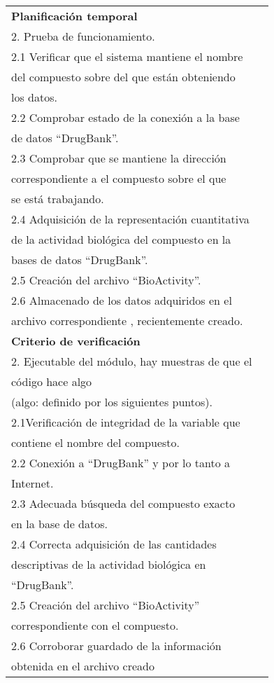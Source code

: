 \begin{longtable}{|l|l|}
\textbf{Planificación temporal}                                                        & \begin{tabular}[c]{@{}l@{}}1. Prueba de compilación.\\ 2. Prueba de funcionamiento.\\ 2.1 Verificar que el sistema mantiene el nombre \\ del compuesto sobre del que están obteniendo \\ los datos.\\ 2.2 Comprobar estado de la conexión a la base \\ de datos “DrugBank”.\\ 2.3 Comprobar que se mantiene la dirección\\ correspondiente  a el compuesto sobre el que \\ se está trabajando.\\ 2.4 Adquisición de la representación cuantitativa  \\ de la actividad biológica del compuesto en la \\ bases de datos “DrugBank”. \\ 2.5 Creación del archivo “BioActivity”.\\ 2.6 Almacenado de los datos adquiridos en el \\ archivo correspondiente , recientemente creado.\end{tabular}                                                                                                                                \\ \hline
\textbf{Criterio de verificación}                                                      & \begin{tabular}[c]{@{}l@{}}1. Compilación del código.\\ 2. Ejecutable del módulo, hay muestras de que el \\ código hace algo\\ (algo: definido por los siguientes puntos).\\ 2.1Verificación de integridad de la variable que \\ contiene el nombre del compuesto.\\ 2.2 Conexión a  “DrugBank” y por lo tanto a \\ Internet.\\ 2.3 Adecuada búsqueda del compuesto exacto \\ en la base de datos.\\ 2.4 Correcta adquisición de las cantidades \\ descriptivas de la actividad biológica en \\ “DrugBank”.\\ 2.5 Creación del archivo “BioActivity” \\ correspondiente con el compuesto.\\ 2.6 Corroborar guardado de la información \\ obtenida en el archivo creado\end{tabular}                                                                                                                                       \\ \hline

\end{longtable}
